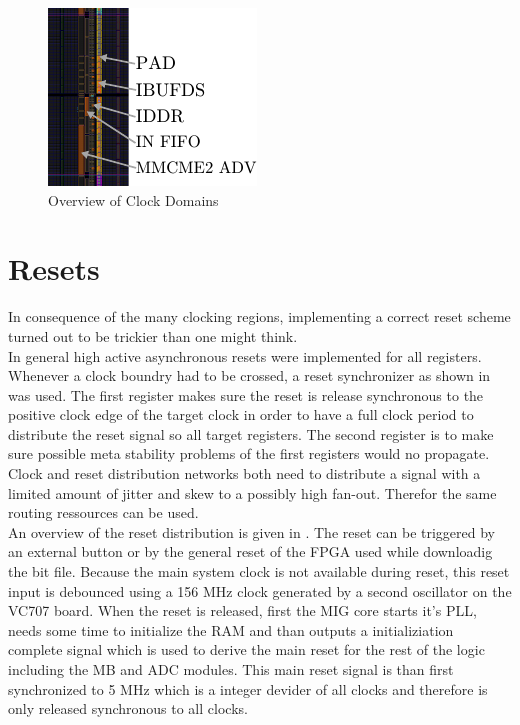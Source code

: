 \begin{figure}
  \centering
  \includegraphics{figures/adc_input_bank}
  \caption{Overview of Clock Domains}
  \label{fig:fpga_clock_domains}
\end{figure}

\section{Resets}
\label{sec:fpga_reset}

In consequence of the many clocking regions, implementing a correct
reset scheme turned out to be trickier than one might think. \\

In general high active asynchronous resets were implemented for all
registers. Whenever a clock boundry had to be crossed, a reset synchronizer
as shown in  was used. The first register
makes sure the reset is release synchronous to the positive clock edge
of the target clock in order to have a full clock period to distribute
the reset signal so all target registers. The second register is
to make sure possible meta stability problems of the first registers would
no propagate. Clock and reset distribution networks both need to
distribute a signal with a limited amount of jitter and skew to a possibly
high fan-out. Therefor the same routing ressources can be used.  \\

An overview of the reset distribution is given in
. The reset can be triggered
by an external button or by the general reset of the \gls{FPGA}
used while downloadig the bit file. Because the main system clock is
not available during reset, this reset input is debounced using a
156 MHz clock generated by a second oscillator on the VC707 board.
When the reset is released, first the \gls{MIG} core starts
it's \gls{PLL}, needs some time to initialize the \gls{RAM} and than
outputs a initializiation complete signal which is used to derive the main reset
for the rest of the logic including the \gls{MB} and \gls{ADC} modules.
This main reset signal is than first synchronized to 5 MHz which is a
integer devider of all clocks and therefore is only released synchronous
to all clocks. \\

